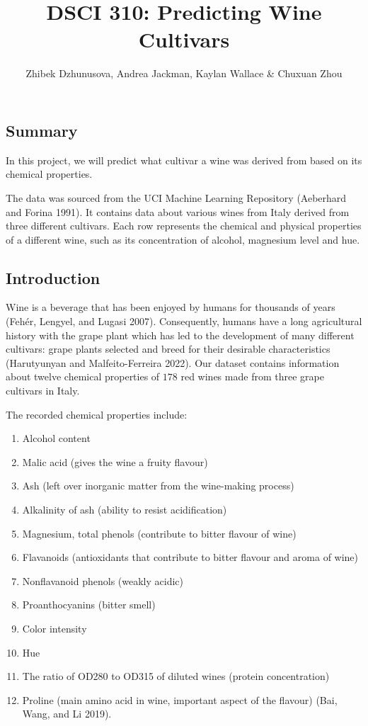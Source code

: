 \documentclass[
  letterpaper,
  DIV=11,
  numbers=noendperiod]{scrartcl}
\title{DSCI 310: Predicting Wine Cultivars}
\author{Zhibek Dzhunusova, Andrea Jackman, Kaylan Wallace \& Chuxuan
Zhou}
\date{}
\providecommand{\tightlist}{%
  \setlength{\itemsep}{0pt}\setlength{\parskip}{0pt}}\usepackage{longtable,booktabs,array}
\renewcommand*\contentsname{Table of contents}
\newcommand\contentsname{Table of contents}
\begin{document}
\maketitle

\renewcommand*\contentsname{Table of contents}
{
\hypersetup{linkcolor=}
\setcounter{tocdepth}{3}
\tableofcontents
}
\subsection{Summary}\label{summary}

In this project, we will predict what cultivar a wine was derived from
based on its chemical properties.

The data was sourced from the UCI Machine Learning Repository (Aeberhard
and Forina 1991). It contains data about various wines from Italy
derived from three different cultivars. Each row represents the chemical
and physical properties of a different wine, such as its concentration
of alcohol, magnesium level and hue.

\subsection{Introduction}\label{introduction}

Wine is a beverage that has been enjoyed by humans for thousands of
years (Fehér, Lengyel, and Lugasi 2007). Consequently, humans have a
long agricultural history with the grape plant which has led to the
development of many different cultivars: grape plants selected and breed
for their desirable characteristics (Harutyunyan and Malfeito-Ferreira
2022). Our dataset contains information about twelve chemical properties
of \(178\) red wines made from three grape cultivars in Italy.

The recorded chemical properties include:

\begin{enumerate}
\def\labelenumi{\arabic{enumi}.}
\tightlist
\item
  Alcohol content
\item
  Malic acid (gives the wine a fruity flavour)
\item
  Ash (left over inorganic matter from the wine-making process)
\item
  Alkalinity of ash (ability to resist acidification)
\item
  Magnesium, total phenols (contribute to bitter flavour of wine)
\item
  Flavanoids (antioxidants that contribute to bitter flavour and aroma
  of wine)
\item
  Nonflavanoid phenols (weakly acidic)
\item
  Proanthocyanins (bitter smell)
\item
  Color intensity
\item
  Hue
\item
  The ratio of OD280 to OD315 of diluted wines (protein concentration)
\item
  Proline (main amino acid in wine, important aspect of the flavour)
  (Bai, Wang, and Li 2019).
\end{enumerate}
\end{document}
